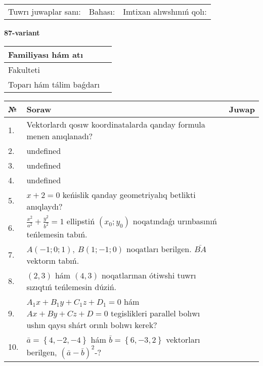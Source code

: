 \documentclass{article}
\begin{document}
\vspace{0.7cm}

\begin{tabular}{lll}
Tuwrı juwaplar sanı: \underline{\hspace{1cm}} & 
Bahası: \underline{\hspace{1cm}} & 
Imtixan alıwshınıń qolı: \underline{\hspace{2cm}} \\
\end{tabular}

\egroup

\newpage


\textbf{87-variant}\\

\bgroup
\def\arraystretch{1.6} %

\begin{tabular}{|m{5.7cm}|m{9.5cm}|}
\hline
Familiyası hám atı & \\
\hline
Fakulteti  & \\
\hline
Toparı hám tálim baǵdarı  & \\
\hline
\end{tabular}

\vspace{0.7cm}

\begin{tabular}{|m{0.7cm}|m{10cm}|m{4cm}|}
\hline
№ & Soraw & Juwap \\
\hline
1. & Vektorlardı qosıw koordinatalarda qanday formula menen anıqlanadı? &  \\
\hline
2. & undefined &  \\
\hline
3. & undefined &  \\
\hline
4. & undefined &  \\
\hline
5. & \(x + 2 = 0\) keńislik qanday geometriyalıq betlikti anıqlaydı? &  \\
\hline
6. & \(\frac{x^{2}}{a^{2}} + \frac{y^{2}}{b^{2}} = 1\) ellipstiń \((x_{0};y_{0})\) noqatındaǵı urınbasınıń teńlemesin tabıń. &  \\
\hline
7. & \(A (- 1;0;1),\ B (1; - 1;0)\) noqatları berilgen. \(\bar{BA}\) vektorın tabıń. &  \\
\hline
8. & $(2, 3)$ hám $(4, 3)$ noqatlarınan ótiwshi tuwrı sızıqtıń teńlemesin dúziń. &  \\
\hline
9. & \(A_{1}x + B_{1}y + C_{1}z + D_{1} = 0\) hám \(Ax + By + Cz + D = 0\) tegislikleri parallel bolıwı ushın qaysı shárt orınlı bolıwı kerek? &  \\
\hline
10. & \(\bar{a} = \left\{ 4,- 2,- 4 \right\}\) hám \(\bar{b} = \left\{ 6,- 3, 2 \right\}\) vektorları berilgen, \((\bar{a} - \bar{b}) ^{2}\)-? & \\
\hline
\end{tabular}
\end{document}
